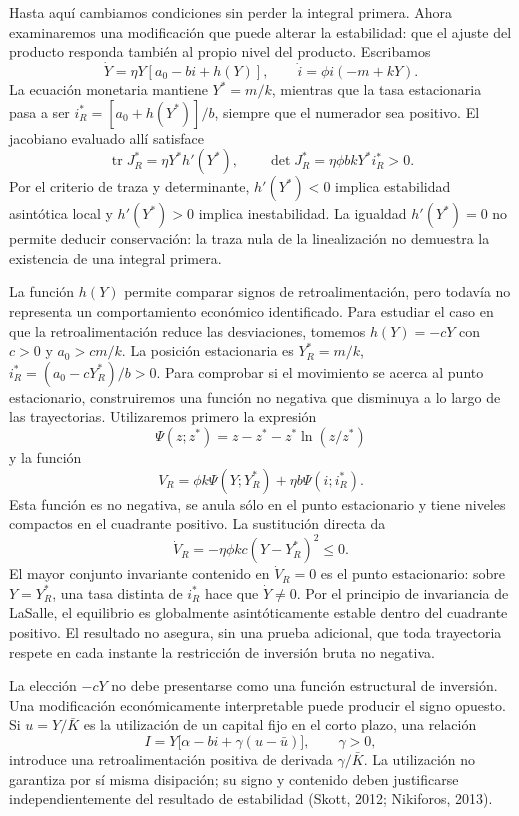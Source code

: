 \documentclass[10.5pt,twoside]{article}
\newcounter{rsec}
\newcommand{\rsection}{%
  \refstepcounter{rsec}%
  \par\vspace{1.35em}%
  \begin{center}\fontsize{14}{16}\selectfont\Roman{rsec}\end{center}%
  \vspace{0.35em}%
}
\begin{document}
\rsection
Hasta aquí cambiamos condiciones sin perder la integral primera. Ahora examinaremos una modificación que puede alterar la estabilidad: que el ajuste del producto responda también al propio nivel del producto. Escribamos
\[
 \mathord{\dot Y=\eta Y[a_0-bi+h(Y)],\qquad
 \dot i=\phi i(-m+kY).}
\]
La ecuación monetaria mantiene $Y^*=m/k$, mientras que la tasa estacionaria pasa a ser $i_R^*=[a_0+h(Y^*)]/b$, siempre que el numerador sea positivo. El jacobiano evaluado allí satisface
\[
 \mathord{\operatorname{tr}J_R^*=\eta Y^*h'(Y^*),\qquad
 \det J_R^*=\eta\phi bkY^*i_R^*>0.}
\]
Por el criterio de traza y determinante, $h'(Y^*)<0$ implica estabilidad asintótica local y $h'(Y^*)>0$ implica inestabilidad. La igualdad $h'(Y^*)=0$ no permite deducir conservación: la traza nula de la linealización no demuestra la existencia de una integral primera.

La función $h(Y)$ permite comparar signos de retroalimentación, pero todavía no representa un comportamiento económico identificado. Para estudiar el caso en que la retroalimentación reduce las desviaciones, tomemos $h(Y)=-cY$ con $c>0$ y $a_0>cm/k$. La posición estacionaria es $Y_R^*=m/k$, $i_R^*=(a_0-cY_R^*)/b>0$. Para comprobar si el movimiento se acerca al punto estacionario, construiremos una función no negativa que disminuya a lo largo de las trayectorias. Utilizaremos primero la expresión
\[
 \Psi(z;z^*)=z-z^*-z^*\ln(z/z^*)
\]
y la función
\[
 V_R=\phi k\Psi(Y;Y_R^*)+\eta b\Psi(i;i_R^*).
\]
Esta función es no negativa, se anula sólo en el punto estacionario y tiene niveles compactos en el cuadrante positivo. La sustitución directa da
\[
 \mathord{\dot V_R=-\eta\phi kc(Y-Y_R^*)^2\leq0.}
\]
El mayor conjunto invariante contenido en $\dot V_R=0$ es el punto estacionario: sobre $Y=Y_R^*$, una tasa distinta de $i_R^*$ hace que $\dot Y\ne0$. Por el principio de invariancia de LaSalle, el equilibrio es globalmente asintóticamente estable dentro del cuadrante positivo. El resultado no asegura, sin una prueba adicional, que toda trayectoria respete en cada instante la restricción de inversión bruta no negativa.

La elección $-cY$ no debe presentarse como una función estructural de inversión. Una modificación económicamente interpretable puede producir el signo opuesto. Si $u=Y/\bar K$ es la utilización de un capital fijo en el corto plazo, una relación
\[
 I=Y\bigl[\alpha-bi+\gamma(u-\bar u)\bigr],\qquad\gamma>0,
\]
introduce una retroalimentación positiva de derivada $\gamma/\bar K$. La utilización no garantiza por sí misma disipación; su signo y contenido deben justificarse independientemente del resultado de estabilidad (Skott, 2012; Nikiforos, 2013).
\end{document}
